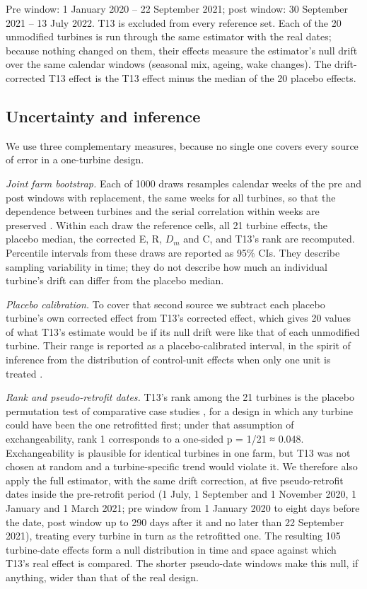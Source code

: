 \documentclass[preprint,12pt]{elsarticle}
\begin{document}
Pre window: 1 January 2020 -- 22 September 2021; post window: 30 September 2021 -- 13 July 2022. T13 is excluded from every reference set. Each of the 20 unmodified turbines is run through the same estimator with the real dates; because nothing changed on them, their effects measure the estimator's null drift over the same calendar windows (seasonal mix, ageing, wake changes). The drift-corrected T13 effect is the T13 effect minus the median of the 20 placebo effects.

\subsection{Uncertainty and inference}

We use three complementary measures, because no single one covers every source of error in a one-turbine design.

\emph{Joint farm bootstrap.} Each of 1000 draws resamples calendar weeks of the pre and post windows with replacement, the same weeks for all turbines, so that the dependence between turbines and the serial correlation within weeks are preserved \cite{kunsch89,bertrand04}. Within each draw the reference cells, all 21 turbine effects, the placebo median, the corrected E, R, \(D_{m}\) and C, and T13's rank are recomputed. Percentile intervals from these draws are reported as 95\% CIs. They describe sampling variability in time; they do not describe how much an individual turbine's drift can differ from the placebo median.

\emph{Placebo calibration.} To cover that second source we subtract each placebo turbine's own corrected effect from T13's corrected effect, which gives 20 values of what T13's estimate would be if its null drift were like that of each unmodified turbine. Their range is reported as a placebo-calibrated interval, in the spirit of inference from the distribution of control-unit effects when only one unit is treated \cite{conley11}.

\emph{Rank and pseudo-retrofit dates.} T13's rank among the 21 turbines is the placebo permutation test of comparative case studies \cite{abadie10}, for a design in which any turbine could have been the one retrofitted first; under that assumption of exchangeability, rank 1 corresponds to a one-sided p = 1/21 ≈ 0.048. Exchangeability is plausible for identical turbines in one farm, but T13 was not chosen at random and a turbine-specific trend would violate it. We therefore also apply the full estimator, with the same drift correction, at five pseudo-retrofit dates inside the pre-retrofit period (1 July, 1 September and 1 November 2020, 1 January and 1 March 2021; pre window from 1 January 2020 to eight days before the date, post window up to 290 days after it and no later than 22 September 2021), treating every turbine in turn as the retrofitted one. The resulting 105 turbine-date effects form a null distribution in time and space against which T13's real effect is compared. The shorter pseudo-date windows make this null, if anything, wider than that of the real design.
\end{document}
